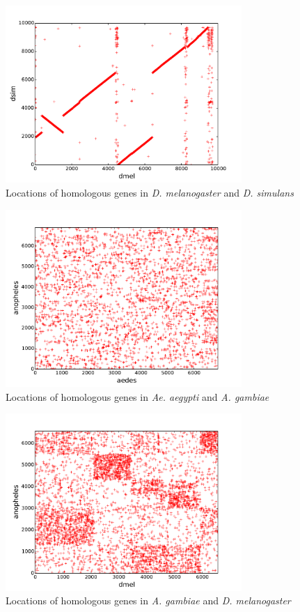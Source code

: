 \begin{figure}[h!]
  \centering
    \includegraphics[width=0.8\textwidth]{figures/synteny/dmel_dsim_plot}
  \caption{Locations of homologous genes in \emph{D. melanogaster} and \emph{D. simulans}}
\end{figure}

\begin{figure}[h!]
  \centering
    \includegraphics[width=0.8\textwidth]{figures/synteny/aedes_anopheles_plot}
  \caption{Locations of homologous genes in \emph{Ae. aegypti} and \emph{A. gambiae}}
\end{figure}

\begin{figure}[h!]
  \centering
    \includegraphics[width=0.8\textwidth]{figures/synteny/dmel_anopheles_plot}
  \caption{Locations of homologous genes in \emph{A. gambiae} and \emph{D. melanogaster}}
\end{figure}

